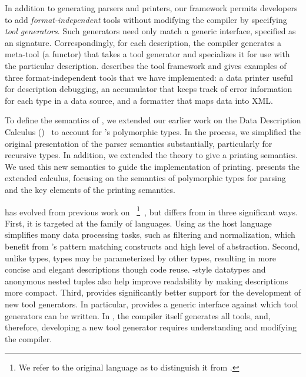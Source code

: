 In addition to generating parsers and printers, our framework permits
developers to add {\em format-independent} tools without modifying the \padsml{} compiler by specifying \textit{tool generators}.  Such generators need only match a generic interface, specified as an \ml{} signature.  
Correspondingly, for each \padsml{} description, the \padsml{} compiler generates a meta-tool (a functor)
that takes a tool generator and specializes it for use with
the particular description.   describes the
tool framework and gives examples of three format-independent 
tools that we have
implemented: a data printer useful for description debugging,
an accumulator that keeps track of error information for
each type in a data source, and a formatter that maps data into XML.

To define the semantics of \padsml{}, we extended our earlier work on the Data Description Calculus (\ddcold{})~\cite{fisher+:next700ddl} to account for \padsml{}'s
polymorphic types.  In the process, we simplified the original presentation
of the parser semantics substantially, particularly for recursive types.  
In addition, we extended the theory to give a printing semantics.
We used this new semantics to guide the \padsml{} implementation of printing.   presents the extended \ddc{} calculus, focusing on the semantics of polymorphic types for parsing and the key elements of the printing semantics.  

\padsml{} has evolved from previous work on
\padsc{}~\footnote{We refer to the original
\pads{} language as \padsc{} to distinguish it from \padsml{}.}~\cite{fisher+:pads}, but
\padsml{} differs from \padsc{} in three significant ways.  First, it
is targeted at the \ml{} family of languages.  Using \ml{} as the host
language simplifies many data processing tasks, such as filtering and normalization, 
which benefit from \ml{}'s pattern matching constructs and
high level of abstraction.  Second, unlike \padsc{} types, \padsml{}
types may be parameterized by other types, resulting in more concise
and elegant descriptions though code reuse.  \ml{}-style datatypes and 
anonymous nested tuples also help improve readability by making descriptions more compact.  Third, \padsml{} provides
significantly better support for the development of new tool generators.
In particular, \padsml{} provides a generic interface against which
tool generators can be written.  In \padsc{}, the compiler itself
generates all tools, and, therefore, developing a new tool generator
requires understanding and modifying the compiler.

